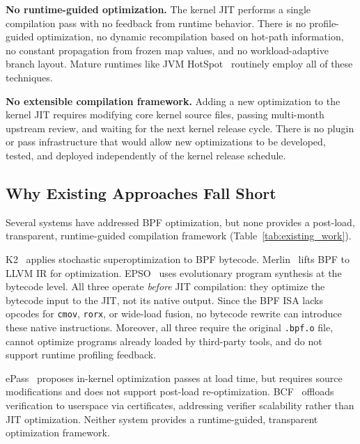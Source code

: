 \documentclass[sigconf,anonymous]{acmart}
\begin{document}
\textbf{No runtime-guided optimization.} The kernel JIT performs a
single compilation pass with no feedback from runtime behavior. There
is no profile-guided optimization, no dynamic recompilation based on
hot-path information, no constant propagation from frozen map values,
and no workload-adaptive branch layout. Mature runtimes like JVM
HotSpot~\cite{jvm_hotspot} routinely employ all of these techniques.

\textbf{No extensible compilation framework.} Adding a new
optimization to the kernel JIT requires modifying core kernel source
files, passing multi-month upstream review, and waiting for the next
kernel release cycle. There is no plugin or pass infrastructure that
would allow new optimizations to be developed, tested, and deployed
independently of the kernel release schedule.

\subsection{Why Existing Approaches Fall Short}

Several systems have addressed BPF optimization, but none provides a
post-load, transparent, runtime-guided compilation framework
(Table~\ref{tab:existing_work}).

K2~\cite{k2} applies stochastic superoptimization to BPF bytecode.
Merlin~\cite{merlin} lifts BPF to LLVM IR for optimization.
EPSO~\cite{epso} uses evolutionary program synthesis at the bytecode
level. All three operate \emph{before} JIT compilation: they optimize
the bytecode input to the JIT, not its native output. Since the BPF
ISA lacks opcodes for \texttt{cmov}, \texttt{rorx}, or wide-load
fusion, no bytecode rewrite can introduce these native instructions.
Moreover, all three require the original \texttt{.bpf.o} file, cannot
optimize programs already loaded by third-party tools, and do not
support runtime profiling feedback.

ePass~\cite{epass} proposes in-kernel optimization passes at load
time, but requires source modifications and does not support post-load
re-optimization. BCF~\cite{bcf} offloads verification to userspace
via certificates, addressing verifier scalability rather than JIT
optimization. Neither system provides a runtime-guided, transparent
optimization framework.
\end{document}
